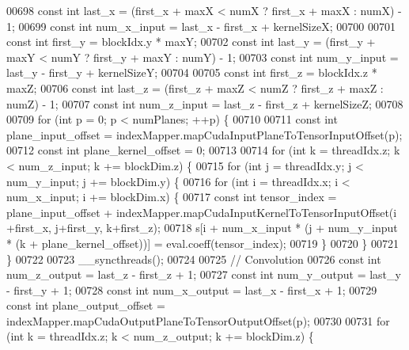 \begin{DoxyCode}
00698   \textcolor{keyword}{const} \textcolor{keywordtype}{int} last\_x = (first\_x + maxX < numX ? first\_x + maxX : numX) - 1;
00699   \textcolor{keyword}{const} \textcolor{keywordtype}{int} num\_x\_input = last\_x - first\_x + kernelSizeX;
00700 
00701   \textcolor{keyword}{const} \textcolor{keywordtype}{int} first\_y = blockIdx.y * maxY;
00702   \textcolor{keyword}{const} \textcolor{keywordtype}{int} last\_y = (first\_y + maxY < numY ? first\_y + maxY : numY) - 1;
00703   \textcolor{keyword}{const} \textcolor{keywordtype}{int} num\_y\_input = last\_y - first\_y + kernelSizeY;
00704 
00705   \textcolor{keyword}{const} \textcolor{keywordtype}{int} first\_z = blockIdx.z * maxZ;
00706   \textcolor{keyword}{const} \textcolor{keywordtype}{int} last\_z = (first\_z + maxZ < numZ ? first\_z + maxZ : numZ) - 1;
00707   \textcolor{keyword}{const} \textcolor{keywordtype}{int} num\_z\_input = last\_z - first\_z + kernelSizeZ;
00708 
00709   \textcolor{keywordflow}{for} (\textcolor{keywordtype}{int} p = 0; p < numPlanes; ++p) \{
00710 
00711     \textcolor{keyword}{const} \textcolor{keywordtype}{int} plane\_input\_offset = indexMapper.mapCudaInputPlaneToTensorInputOffset(p);
00712     \textcolor{keyword}{const} \textcolor{keywordtype}{int} plane\_kernel\_offset = 0;
00713 
00714     \textcolor{keywordflow}{for} (\textcolor{keywordtype}{int} k = threadIdx.z; k < num\_z\_input; k += blockDim.z) \{
00715       \textcolor{keywordflow}{for} (\textcolor{keywordtype}{int} j = threadIdx.y; j < num\_y\_input; j += blockDim.y) \{
00716         \textcolor{keywordflow}{for} (\textcolor{keywordtype}{int} i = threadIdx.x; i < num\_x\_input; i += blockDim.x) \{
00717           \textcolor{keyword}{const} \textcolor{keywordtype}{int} tensor\_index = plane\_input\_offset + indexMapper.mapCudaInputKernelToTensorInputOffset(i
      +first\_x, j+first\_y, k+first\_z);
00718           s[i + num\_x\_input * (j + num\_y\_input * (k + plane\_kernel\_offset))] = eval.coeff(tensor\_index);
00719         \}
00720       \}
00721     \}
00722 
00723     \_\_syncthreads();
00724 
00725     \textcolor{comment}{// Convolution}
00726     \textcolor{keyword}{const} \textcolor{keywordtype}{int} num\_z\_output = last\_z - first\_z + 1;
00727     \textcolor{keyword}{const} \textcolor{keywordtype}{int} num\_y\_output = last\_y - first\_y + 1;
00728     \textcolor{keyword}{const} \textcolor{keywordtype}{int} num\_x\_output = last\_x - first\_x + 1;
00729     \textcolor{keyword}{const} \textcolor{keywordtype}{int} plane\_output\_offset = indexMapper.mapCudaOutputPlaneToTensorOutputOffset(p);
00730 
00731     \textcolor{keywordflow}{for} (\textcolor{keywordtype}{int} k = threadIdx.z; k < num\_z\_output; k += blockDim.z) \{

\end{DoxyCode}
